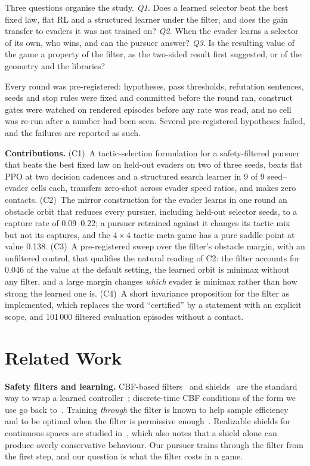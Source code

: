 \documentclass[conference]{IEEEtran}
\begin{document}
Three questions organise the study.
\emph{Q1.} Does a learned selector beat the best fixed law, flat RL and a structured learner under the filter, and does the gain transfer to evaders it was not trained on?
\emph{Q2.} When the evader learns a selector of its own, who wins, and can the pursuer answer?
\emph{Q3.} Is the resulting value of the game a property of the filter, as the two-sided result first suggested, or of the geometry and the libraries?

Every round was pre-registered: hypotheses, pass thresholds, refutation sentences, seeds and stop rules were fixed and committed before the round ran, construct gates were watched on rendered episodes before any rate was read, and no cell was re-run after a number had been seen. Several pre-registered hypotheses failed, and the failures are reported as such.

\textbf{Contributions.}
(C1)~A tactic-selection formulation for a safety-filtered pursuer that beats the best fixed law on held-out evaders on two of three seeds, beats flat PPO at two decision cadences and a structured search learner in 9 of 9 seed--evader cells each, transfers zero-shot across evader speed ratios, and makes zero contacts.
(C2)~The mirror construction for the evader learns in one round an obstacle orbit that reduces every pursuer, including held-out selector seeds, to a capture rate of 0.09--0.22; a pursuer retrained against it changes its tactic mix but not its captures, and the $4\times4$ tactic meta-game has a pure saddle point at value 0.138.
(C3)~A pre-registered sweep over the filter's obstacle margin, with an unfiltered control, that qualifies the natural reading of C2: the filter accounts for 0.046 of the value at the default setting, the learned orbit is minimax without any filter, and a large margin changes \emph{which} evader is minimax rather than how strong the learned one is.
(C4)~A short invariance proposition for the filter as implemented, which replaces the word ``certified'' by a statement with an explicit scope, and 101\,000 filtered evaluation episodes without a contact.

\section{Related Work}
\textbf{Safety filters and learning.} CBF-based filters~\cite{ames2019cbf} and shields~\cite{alshiekh2018shielding} are the standard way to wrap a learned controller~\cite{hsu2024safetyfilter}; discrete-time CBF conditions of the form we use go back to~\cite{agrawal2017discrete}. Training \emph{through} the filter is known to help sample efficiency~\cite{pizarro2025filtering} and to be optimal when the filter is permissive enough~\cite{oh2026provably}. Realizable shields for continuous spaces are studied in~\cite{kim2025realizable}, which also notes that a shield alone can produce overly conservative behaviour. Our pursuer trains through the filter from the first step, and our question is what the filter costs in a game.
\end{document}
